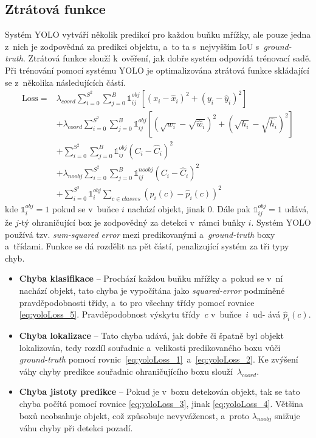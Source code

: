 \subsection*{Ztrátová funkce}
Systém YOLO vytváří několik predikcí pro každou buňku mřížky, ale pouze jedna z~nich je zodpovědná za predikci objektu, a~to ta s~nejvyšším IoU s~\emph{ground-truth}. Ztrátová funkce slouží k~ověření, jak dobře systém odpovídá trénovací sadě. Při trénování pomocí systému YOLO je optimalizována ztrátová funkce skládající se z~několika následujících částí.
\begin{align}
\mathrm{Loss} = &\lambda_{coord} \sum_{i=0}^{S^2}\sum_{j=0}^B \mathds{1}_{ij}^{obj}[(x_i-\hat{x}_i)^2 + (y_i-\hat{y}_i)^2 ] \label{eq:yoloLoss_1}\\
&+ \lambda_{coord} \sum_{i=0}^{S^2}\sum_{j=0}^B \mathds{1}_{ij}^{obj}[(\sqrt{w_i}-\sqrt{\hat{w}_i})^2 +(\sqrt{h_i}-\sqrt{\hat{h}_i})^2 ]\label{eq:yoloLoss_2}\\
&+ \sum_{i=0}^{S^2}\sum_{j=0}^B \mathds{1}_{ij}^{obj}(C_i - \hat{C}_i)^2 \label{eq:yoloLoss_3}\\
&+ \lambda_{noobj}\sum_{i=0}^{S^2}\sum_{j=0}^B \mathds{1}_{ij}^{noobj}(C_i - \hat{C}_i)^2 \label{eq:yoloLoss_4}\\
&+ \sum_{i=0}^{S^2} \mathds{1}_{i}^{obj}\sum_{c \in classes}(p_i(c) - \hat{p}_i(c))^2 \label{eq:yoloLoss_5}
\end{align}
kde $\mathds{1}_{i}^{obj} = 1$ pokud se v~buňce $i$ nachází objekt, jinak $0$. Dále pak $\mathds{1}_{ij}^{obj} = 1$ udává, že $j$-tý ohraničující box je zodpovědný za detekci v~rámci buňky $i$. Systém YOLO používá tzv. \emph{sum-squared error} mezi predikovanými a~\emph{ground-truth} boxy a~třídami. Funkce se dá rozdělit na pět částí, penalizující systém za tři typy chyb.

\begin{itemize}
    \item \textbf{Chyba klasifikace} -- Prochází každou buňku mřížky a~pokud se v~ní nachází objekt, tato chyba je vypočítána jako \emph{squared-error} podmíněné pravděpodobnosti třídy, a~to pro všechny třídy pomocí rovnice \eqref{eq:yoloLoss_5}. Pravděpodobnost výskytu třídy~$c$ v~buňce~$i$~ud- ává $\hat{p}_i(c)$.
    \item \textbf{Chyba lokalizace} -- Tato chyba udává, jak dobře či špatně byl objekt lokalizován, tedy rozdíl souřadnic a~velikosti predikovaného boxu vůči \emph{ground-truth} pomocí rovnic~\eqref{eq:yoloLoss_1}~a~\eqref{eq:yoloLoss_2}. Ke zvýšení váhy chyby predikce souřadnic ohraničujícího boxu slouží~$\lambda_{coord}$.
    \item \textbf{Chyba jistoty predikce} -- Pokud je v~boxu detekován objekt, tak se tato chyba počítá pomocí rovnice \eqref{eq:yoloLoss_3}, jinak \eqref{eq:yoloLoss_4}. Většina boxů neobsahuje objekt, což způsobuje nevyváženost, a~proto $\lambda_{noobj}$ snižuje váhu chyby při detekci pozadí.
\end{itemize}

